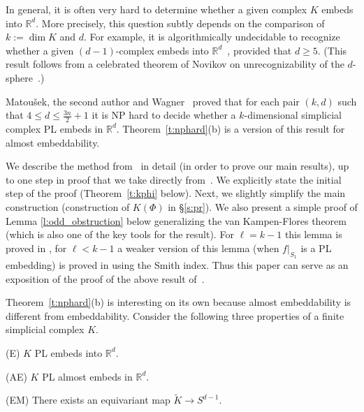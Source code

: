 \documentclass[runningheads]{llncs}
\theoremstyle{remark}
\theoremstyle{definition}
\newcommand{\R}{\mathbb{R}}
\def\t{\widetilde}
\begin{document}
In general, it is often very hard to determine whether a given complex $K$ embeds into $\R^d$.
More precisely, this question subtly depends on the
comparison of $k:=\dim K$ and $d$.
For example, it is algorithmically undecidable to recognize whether a given $(d-1)$-complex embeds into $\R^d$~\cite{MaTaWa11}, provided that $d \geq 5$.
(This result follows from a celebrated theorem of Novikov on unrecognizability of the $d$-sphere~\cite{VoKuFo74}.)

Matou\v{s}ek, the second author and Wagner~\cite{MaTaWa11} proved that for each pair $(k,d)$ such that
$4\le d\le \frac{3n}2+1$ it is NP hard to decide whether a $k$-dimensional simplicial complex PL embeds in $\R^d$.
  Theorem~\ref{t:nphard}(b) is a version of this result for almost embeddability.

We describe the method from~\cite{MaTaWa11} in detail (in order to prove our main results), up to one step in proof that we take directly from~\cite{MaTaWa11}.
We explicitly state the initial step of the proof (Theorem~\ref{t:kphi} below).
Next, we slightly simplify the main construction (construction of $K(\Phi)$ in \S\ref{s:pr}).
We also present a simple proof of Lemma \ref{l:odd_obstruction} below generalizing the van Kampen-Flores theorem (which is also one of the key tools for the result).
For $\ell=k-1$ this lemma is proved in \cite{VK}, for $\ell<k-1$ a weaker version of this lemma
(when $f|_{S_1}$ is a PL embedding) is proved in \cite[Lemma~1.4]{SeSp92} using the Smith index.
Thus this paper can serve as an exposition of the proof of the above result of~\cite{MaTaWa11}.


Theorem~\ref{t:nphard}(b) is interesting on its own because almost embeddability is different from embeddability.
Consider the following three properties of a finite simplicial complex $K$.

(E) $K$ PL embeds into $\R^d$.

(AE) $K$ PL almost embeds in $\R^d$.

(EM) There exists an equivariant map $\t K\to S^{d-1}$.
\end{document}
